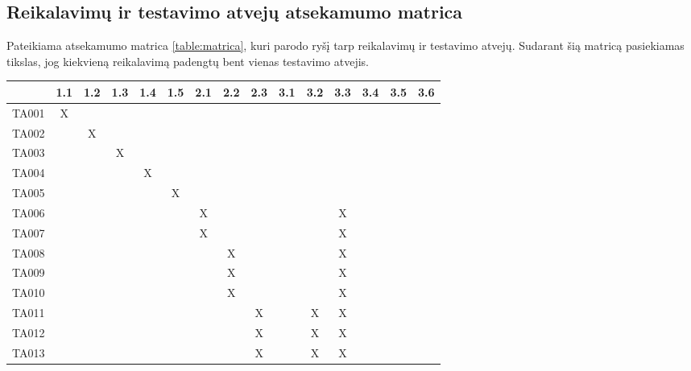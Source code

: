 \subsection{Reikalavimų ir testavimo atvejų atsekamumo matrica}

Pateikiama atsekamumo matrica \ref{table:matrica}, kuri parodo ryšį tarp reikalavimų ir testavimo atvejų.
Sudarant šią matricą pasiekiamas tikslas, jog kiekvieną reikalavimą padengtų bent vienas testavimo atvejis.

\begin{table}[h]
  \centering
  \begin{tabular}{|c|c|c|c|c|c|c|c|c|c|c|c|c|c|c|}
    \hline
          & 1.1 & 1.2 & 1.3 & 1.4 & 1.5 & 2.1 & 2.2 & 2.3 & 3.1 & 3.2 & 3.3 & 3.4 & 3.5 & 3.6 \\ \hline
    TA001 & X   &     &     &     &     &     &     &     &     &     &     &     &     &     \\ \hline
    TA002 &     & X   &     &     &     &     &     &     &     &     &     &     &     &     \\ \hline
    TA003 &     &     & X   &     &     &     &     &     &     &     &     &     &     &     \\ \hline
    TA004 &     &     &     & X   &     &     &     &     &     &     &     &     &     &     \\ \hline
    TA005 &     &     &     &     & X   &     &     &     &     &     &     &     &     &     \\ \hline
    TA006 &     &     &     &     &     & X   &     &     &     &     & X   &     &     &     \\ \hline
    TA007 &     &     &     &     &     & X   &     &     &     &     & X   &     &     &     \\ \hline
    TA008 &     &     &     &     &     &     & X   &     &     &     & X   &     &     &     \\ \hline
    TA009 &     &     &     &     &     &     & X   &     &     &     & X   &     &     &     \\ \hline
    TA010 &     &     &     &     &     &     & X   &     &     &     & X   &     &     &     \\ \hline
    TA011 &     &     &     &     &     &     &     & X   &     & X   & X   &     &     &     \\ \hline
    TA012 &     &     &     &     &     &     &     & X   &     & X   & X   &     &     &     \\ \hline
    TA013 &     &     &     &     &     &     &     & X   &     & X   & X   &     &     &     \\ \hline

\end{tabular}
\end{table}
